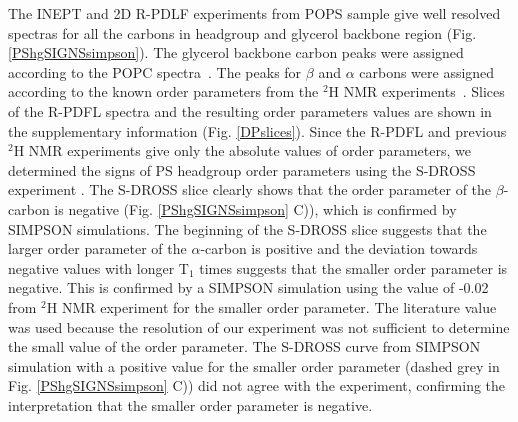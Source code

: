 \documentclass[aps,prl,superscriptaddress,twocolumn]{revtex4}
\begin{document}
The INEPT and 2D R-PDLF experiments from POPS sample give well resolved spectras for all the
carbons in headgroup and glycerol backbone region (Fig. \ref{PShgSIGNSsimpson}).
The glycerol backbone carbon peaks were assigned according to the POPC spectra~\cite{ferreira13}.
The peaks for $\beta$ and $\alpha$ carbons were assigned according to the
known order parameters from the $^2$H NMR experiments~\cite{browning80}.
Slices of the R-PDFL spectra and the resulting order parameters values
are shown in the supplementary information (Fig. \ref{DPslices}). 
Since the R-PDFL and previous $^2$H NMR experiments \cite{browning80,roux91} give 
only the absolute values of order parameters, we determined the signs of PS headgroup
order parameters using the S-DROSS experiment \cite{gross97}.
The S-DROSS slice clearly shows that the order parameter of
the $\beta$-carbon is negative (Fig. \ref{PShgSIGNSsimpson} C)),
which is confirmed by SIMPSON simulations. The beginning of the S-DROSS slice
suggests that the larger order parameter of the $\alpha$-carbon 
is positive and the deviation towards negative values with longer T$_1$ times suggests
that the smaller order parameter is negative. This is confirmed by a SIMPSON simulation
using the value of -0.02 from $^2$H NMR experiment \cite{roux91} for the smaller order parameter.
The literature value was used because the
resolution of our experiment was not sufficient to determine the
small value of the order parameter.
The S-DROSS curve from SIMPSON simulation with a positive value for the smaller order parameter
(dashed grey in Fig. \ref{PShgSIGNSsimpson} C)) did not agree with the experiment, 
confirming the interpretation that the smaller order parameter is negative.
\end{document}
